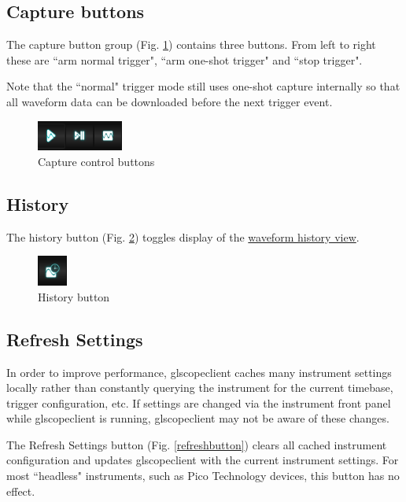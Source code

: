 \subsection{Capture buttons}

The capture button group (Fig. \ref{capturebuttons}) contains three buttons. From left to right these are ``arm
normal trigger", ``arm one-shot trigger" and ``stop trigger".

Note that the ``normal" trigger mode still uses one-shot capture internally so that all waveform data can be downloaded
before the next trigger event.

\begin{figure}[h]
\centering
\includegraphics[height=1cm]{images/capture-icons.png}
\caption{Capture control buttons}
\label{capturebuttons}
\end{figure}

\subsection{History}

The history button (Fig. \ref{historybutton}) toggles display of the \hyperref[sec:history]{waveform history view}.

\begin{figure}[h]
\centering
\includegraphics[height=1cm]{images/history-button.png}
\caption{History button}
\label{historybutton}
\end{figure}

\subsection{Refresh Settings}

In order to improve performance, glscopeclient caches many instrument settings locally rather than constantly querying
the instrument for the current timebase, trigger configuration, etc. If settings are changed via the instrument front
panel while glscopeclient is running, glscopeclient may not be aware of these changes.

The Refresh Settings button (Fig. \ref{refreshbutton}) clears all cached instrument configuration and updates
glscopeclient with the current instrument settings. For most ``headless" instruments, such as Pico Technology devices,
this button has no effect.

